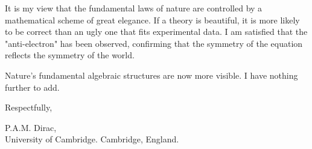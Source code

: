 \documentclass[a4paper]{article}
\begin{document}
It is my view that the fundamental laws of nature are controlled by a mathematical scheme of great elegance. If a theory is beautiful, it is more likely to be correct than an ugly one that fits experimental data. I am satisfied that the "anti-electron" has been observed, confirming that the symmetry of the equation reflects the symmetry of the world.

Nature's fundamental algebraic structures are now more visible. I have nothing further to add.


\bigskip %

Respectfully,

\vspace{20pt} %

P.A.M. Dirac,\\
University of Cambridge. Cambridge, England.
\end{document}
